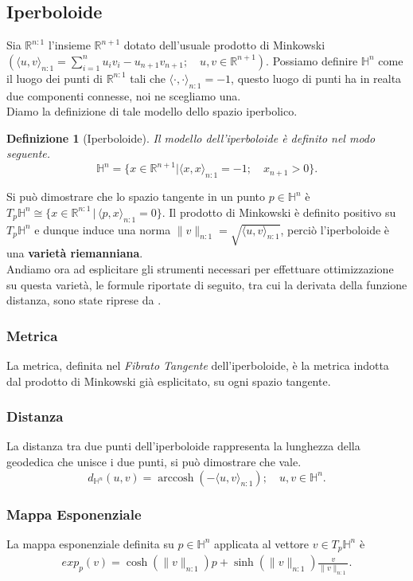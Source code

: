 \documentclass[a4paper, 12pt]{article}
\newtheorem{definition}{Definizione}
\DeclareMathOperator\arccosh{arccosh}
\begin{document}
\subsection{Iperboloide}
Sia $\mathbb{R}^{n:1}$ l'insieme $\mathbb{R}^{n+1}$ dotato dell'usuale prodotto di Minkowski $(\langle u, v \rangle_{n:1} = \sum_{i=1}^{n} u_iv_i - u_{n+1}v_{n+1}; \quad u,v \in \mathbb{R}^{n+1})$. Possiamo definire $\mathbb{H}^n$ come il luogo dei punti di $\mathbb{R}^{n:1}$ tali che $\langle \cdot, \cdot \rangle_{n:1} = -1$, questo luogo di punti ha in realta due componenti connesse, noi ne scegliamo una.\\
Diamo la definizione di tale modello dello spazio iperbolico.
\begin{definition}[Iperboloide]
Il modello dell'iperboloide è definito nel modo seguente.\\
\[\mathbb{H}^n = \{x \in \mathbb{R}^{n+1} | \langle x, x \rangle_{n:1} = -1; \quad x_{n+1} > 0 \}.\]
\end{definition}
Si può dimostrare che lo spazio tangente in un punto $p \in \mathbb{H}^n$ è $T_p\mathbb{H}^n \cong \{x \in \mathbb{R}^{n:1} \, | \, \langle p,x \rangle_{n:1} = 0\}$. Il prodotto di Minkowski è definito positivo su $T_p\mathbb{H}^n$ e dunque induce una norma $\| v \|_{n:1} = \sqrt{\langle u, v \rangle_{n:1}}$, perciò l'iperboloide è una \textbf{varietà riemanniana}.\\
Andiamo ora ad esplicitare gli strumenti necessari per effettuare ottimizzazione su questa varietà, le formule riportate di seguito, tra cui la derivata della funzione distanza, sono state riprese da \cite{Wilson}.
\subsubsection{Metrica}
La metrica, definita nel \textit{Fibrato Tangente} dell'iperboloide, è la metrica indotta dal prodotto di Minkowski già esplicitato, su ogni spazio tangente.
\subsubsection{Distanza}
La distanza tra due punti dell'iperboloide rappresenta la lunghezza della geodedica che unisce i due punti, si può dimostrare che vale.\\
\[d_{\mathbb{H}^n} (u,v) = \arccosh (-\langle u, v \rangle_{n:1}); \quad u,v \in \mathbb{H}^n.\]
\subsubsection{Mappa Esponenziale}
La mappa esponenziale definita su $p \in \mathbb{H}^n$ applicata al vettore $v \in T_p\mathbb{H}^n$ è\\
\begin{equation*}\begin{gathered}
exp_p(v) = \cosh(\| v \|_{n:1})p + \sinh(\| v \|_{n:1}) \frac{v}{\| v \|_{n:1}}.
\end{gathered}\end{equation*}
\end{document}
